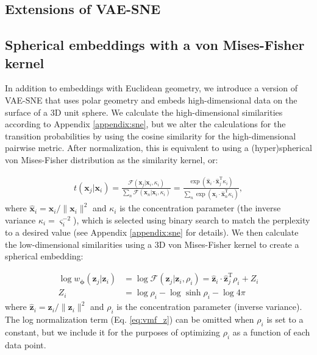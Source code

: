 \documentclass[11pt,a4paper,oneside]{book}
\begin{document}
\begin{doublespace}
\begin{appendices}
\section{Extensions of VAE-SNE}
\label{appendix:extensions}
\subsection{Spherical embeddings with a von Mises-Fisher kernel}
\label{appendix:spherical}
In addition to embeddings with Euclidean geometry, we introduce a version of VAE-SNE that uses polar geometry and embeds high-dimensional data on the surface of a 3D unit sphere. We calculate the high-dimensional similarities according to Appendix \ref{appendix:sne}, but we alter the calculations for the transition probabilities by using the cosine similarity for the high-dimensional pairwise metric. After normalization, this is equivalent to using a (hyper)spherical von Mises-Fisher distribution as the similarity kernel, or:

\begin{align}
     t(\mathbf{x}_j | \mathbf{x}_i) = \frac{\mathcal{F}(\mathbf{x}_j | \mathbf{x}_i, \kappa_i)}{\sum_{n} \mathcal{F}(\mathbf{x}_n | \mathbf{x}_i, \kappa_i)} = \frac{\exp \left(\mathbf{\hat{x}}_i \cdot \mathbf{\hat{x}}_j^{\mathrm{T}} \kappa_i \right)}{\sum_{n} \exp \left(\mathbf{\hat{x}}_i \cdot \mathbf{\hat{x}}_n^{\mathrm{T}} \kappa_i\right)},
\end{align}
where $\mathbf{\hat{x}}_i = \mathbf{x}_i / \|\mathbf{x}_i\|^2$ and $\kappa_i$ is the concentration parameter (the inverse variance $\kappa_i = \varsigma_i^{-2}$), which is selected using binary search to match the perplexity to a desired value (see Appendix \ref{appendix:sne} for details). We then calculate the low-dimensional similarities using a 3D von Mises-Fisher kernel to create a spherical embedding:

\begin{subequations}
    \begin{align}
        \log w_{\boldsymbol{\phi}}(\mathbf{z}_j | \mathbf{z}_i) &= \log \mathcal{F}(\mathbf{z}_j | \mathbf{z}_i, \rho_i) = \mathbf{\hat{z}}_i \cdot \mathbf{\hat{z}}_j^{\mathrm{T}} \rho_i + Z_i \label{eq:vmf_logp}\\
        Z_i &= \log\rho_i - \log\sinh{\rho_i} - \log4\pi \label{eq:vmf_z}
\end{align}
\end{subequations}
where $\mathbf{\hat{z}}_i = \mathbf{z}_i / \|\mathbf{z}_i\|^2$ and $\rho_i$ is the concentration parameter (inverse variance). The log normalization term (Eq. \ref{eq:vmf_z})  can be omitted when $\rho_i$ is set to a constant, but we include it for the purposes of optimizing $\rho_i$ as a function of each data point.


\end{appendices}
\end{doublespace}
\end{document}
